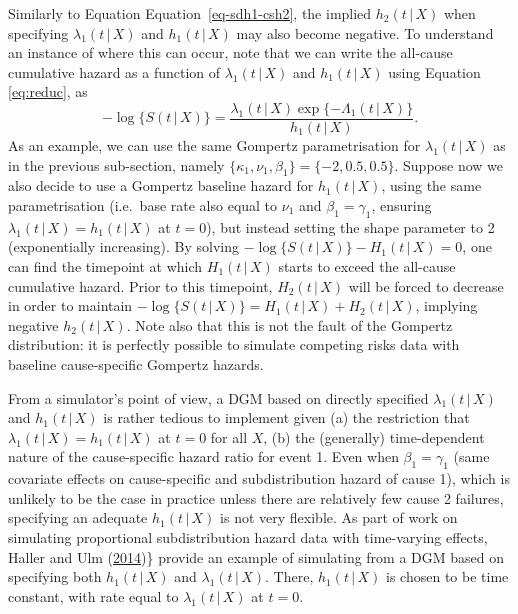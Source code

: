 \documentclass[
  letterpaper,
  DIV=11,
  numbers=noendperiod]{scrreprt}
\newcommand{\given}{\,|\,}
\begin{document}
Similarly to Equation Equation~\ref{eq-sdh1-csh2}, the implied
\(h_2(t \given X)\) when specifying \(\lambda_1(t \given X)\) and
\(h_1(t \given X)\) may also become negative. To understand an instance
of where this can occur, note that we can write the all-cause cumulative
hazard as a function of \(\lambda_1(t \given X)\) and
\(h_1(t \given X)\) using Equation \eqref{eq:reduc}, as
\begin{equation*}
    -\log\{S(t \given X)\} = \frac{\lambda_1(t \given X) \exp\{-\Lambda_1(t \given X)\}}{h_1(t \given X)}.
\end{equation*} As an example, we can use the same Gompertz
parametrisation for \(\lambda_1(t \given X)\) as in the previous
sub-section, namely \(\{\kappa_1, \nu_1, \beta_1\} = \{-2, 0.5, 0.5\}\).
Suppose now we also decide to use a Gompertz baseline hazard for
\(h_1(t \given X)\), using the same parametrisation (i.e.~base rate also
equal to \(\nu_1\) and \(\beta_1 = \gamma_1\), ensuring
\(\lambda_1(t \given X) = h_1(t \given X)\) at \(t = 0\)), but instead
setting the shape parameter to 2 (exponentially increasing). By solving
\(-\log\{S(t \given X)\} - H_1(t \given X) = 0\), one can find the
timepoint at which \(H_1(t \given X)\) starts to exceed the all-cause
cumulative hazard. Prior to this timepoint, \(H_2(t \given X)\) will be
forced to decrease in order to maintain
\(-\log\{S(t \given X)\} = H_1(t \given X) + H_2(t \given X)\), implying
negative \(h_2(t \given X)\). Note also that this is not the fault of
the Gompertz distribution: it is perfectly possible to simulate
competing risks data with baseline cause-specific Gompertz hazards.

From a simulator's point of view, a DGM based on directly specified
\(\lambda_1(t \given X)\) and \(h_1(t \given X)\) is rather tedious to
implement given (a) the restriction that
\(\lambda_1(t \given X) = h_1(t \given X)\) at \(t = 0\) for all \(X\),
(b) the (generally) time-dependent nature of the cause-specific hazard
ratio for event 1. Even when \(\beta_1 = \gamma_1\) (same covariate
effects on cause-specific and subdistribution hazard of cause 1), which
is unlikely to be the case in practice unless there are relatively few
cause 2 failures, specifying an adequate \(h_1(t \given X)\) is not very
flexible. As part of work on simulating proportional subdistribution
hazard data with time-varying effects, Haller and Ulm
(\protect\hyperlink{ref-hallerFlexibleSimulationCompeting2014}{2014})\}
provide an example of simulating from a DGM based on specifying both
\(h_1(t \given X)\) and \(\lambda_1(t \given X)\). There,
\(h_1(t \given X)\) is chosen to be time constant, with rate equal to
\(\lambda_1(t \given X)\) at \(t = 0\).
\end{document}
